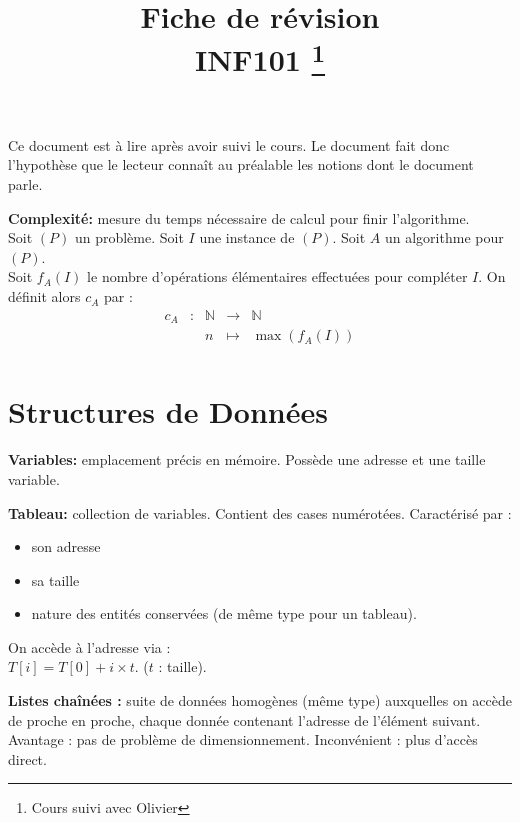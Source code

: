 \documentclass[a4paper, 8pt]{article}
\title{\sffamily\textbf{Fiche de révision \\ INF101} \thanks{Cours suivi avec Olivier \bsc{Hudry} }}
\begin{document}
\renewcommand{\labelitemii}{$\bullet$}

\begin{multicols*}{3}
\setlength{\parindent}{0pt}
\maketitle

\begin{changemargin}{0.5cm}{0.5cm} 
{\footnotesize Ce document est à lire après avoir suivi le cours. Le document fait donc l'hypothèse que le lecteur connaît au préalable les notions dont le document parle.}
\end{changemargin}


\textbf{Complexité:} mesure du temps nécessaire de calcul pour finir l'algorithme.\\ Soit $(P)$ un problème. Soit $I$ une instance de $(P)$. Soit $A$ un algorithme pour $(P)$.\\ Soit $f_A(I)$ le nombre d'opérations élémentaires effectuées pour compléter $I$. On définit alors $c_A$ par :
\[
\begin{array}{cc|ccl}
c_A & : & \mathbb{N} & \to & \mathbb{N} \\
 & & n & \mapsto & \max(f_A(I)) \\
\end{array}
\]

\section*{Structures de Données}

\textbf{Variables:} emplacement précis en mémoire. Possède une adresse et une taille variable.

\textbf{Tableau:} collection de variables. Contient des cases numérotées. Caractérisé par :\begin{itemize}
\item son adresse
\item sa taille
\item nature des entités conservées (de même type pour un tableau).
\end{itemize}
On accède à l'adresse via :\\ $ T\left[ i\right] = T\left[ 0\right] + i\times t $. ($t$ : taille).

\textbf{Listes chaînées :} suite de données homogènes (même type) auxquelles on accède de proche en proche, chaque donnée contenant l'adresse de l'élément suivant. Avantage : pas de problème de dimensionnement. Inconvénient : plus d'accès direct.


\end{multicols*}
\end{document}
